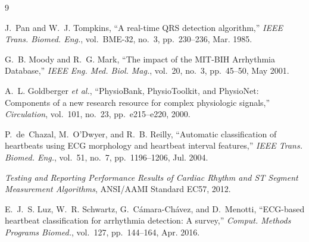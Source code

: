 \documentclass[conference]{IEEEtran}
\begin{document}
\begin{thebibliography}{9}

J.~Pan and W.~J. Tompkins, ``A real-time QRS detection algorithm,''
\emph{IEEE Trans. Biomed. Eng.}, vol.~BME-32, no.~3, pp.~230--236, Mar. 1985.

G.~B. Moody and R.~G. Mark, ``The impact of the MIT-BIH Arrhythmia Database,''
\emph{IEEE Eng. Med. Biol. Mag.}, vol.~20, no.~3, pp.~45--50, May 2001.

A.~L. Goldberger \emph{et al.}, ``PhysioBank, PhysioToolkit, and PhysioNet:
Components of a new research resource for complex physiologic signals,''
\emph{Circulation}, vol.~101, no.~23, pp.~e215--e220, 2000.

P.~de~Chazal, M.~O'Dwyer, and R.~B. Reilly, ``Automatic classification of
heartbeats using ECG morphology and heartbeat interval features,''
\emph{IEEE Trans. Biomed. Eng.}, vol.~51, no.~7, pp.~1196--1206, Jul. 2004.

\emph{Testing and Reporting Performance Results of Cardiac Rhythm and ST Segment
Measurement Algorithms}, ANSI/AAMI Standard EC57, 2012.

E.~J.~S. Luz, W.~R. Schwartz, G.~C\'amara-Ch\'avez, and D.~Menotti, ``ECG-based
heartbeat classification for arrhythmia detection: A survey,''
\emph{Comput. Methods Programs Biomed.}, vol.~127, pp.~144--164, Apr. 2016.

\end{thebibliography}
\end{document}
